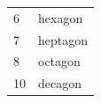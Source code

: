 \begin{table}[H]
{\begin{tabular}[t]{|l|l|}
    
        6 &
    
    
        hexagon%
     \tabularnewline\cline{1-1}\cline{2-2}
    
    
        7 &
    
    
        heptagon%
     \tabularnewline\cline{1-1}\cline{2-2}
    
    
        8 &
    
    
        octagon%
     \tabularnewline\cline{1-1}\cline{2-2}
    
    
        10 &
    
    
        decagon%
     \tabularnewline\cline{1-1}\cline{2-2}
    

\end{tabular}}
\end{table}

